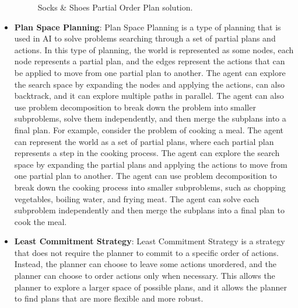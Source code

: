 \begin{itemize}
\begin{figure}[ht]
              \caption{Socks \& Shoes Partial Order Plan solution.}
              \label{fig:socks_shoes_partial_order_plan}
          \end{figure}
    \item \label{def:plan_space_planning}
          \textbf{Plan Space Planning}: Plan Space Planning is a type of planning that is used in \ac{AI} to solve problems searching through a set of partial plans and actions. In this type of planning, the world is represented as some nodes, each node represents a partial plan, and the edges represent the actions that can be applied to move from one partial plan to another. The agent can explore the search space by expanding the nodes and applying the actions, can also backtrack, and it can explore multiple paths in parallel. The agent can also use problem decomposition to break down the problem into smaller subproblems, solve them independently, and then merge the subplans into a final plan. For example, consider the problem of cooking a meal. The agent can represent the world as a set of partial plans, where each partial plan represents a step in the cooking process. The agent can explore the search space by expanding the partial plans and applying the actions to move from one partial plan to another. The agent can use problem decomposition to break down the cooking process into smaller subproblems, such as chopping vegetables, boiling water, and frying meat. The agent can solve each subproblem independently and then merge the subplans into a final plan to cook the meal.

    \item \label{def:least_commitment_strategy}
          \textbf{Least Commitment Strategy}: Least Commitment Strategy is a strategy that does not require the planner to commit to a specific order of actions. Instead, the planner can choose to leave some actions unordered, and the planner can choose to order actions only when necessary. This allows the planner to explore a larger space of possible plans, and it allows the planner to find plans that are more flexible and more robust.


\end{itemize}
